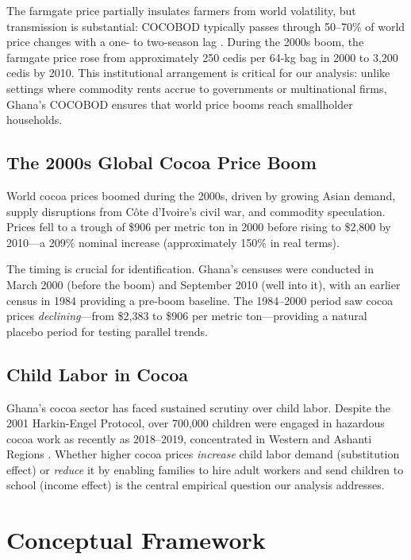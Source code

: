 \documentclass[12pt]{article}
\begin{document}
The farmgate price partially insulates farmers from world volatility, but transmission is substantial: COCOBOD typically passes through 50--70\% of world price changes with a one- to two-season lag \citep{kolavalli2011}. During the 2000s boom, the farmgate price rose from approximately 250 cedis per 64-kg bag in 2000 to 3,200 cedis by 2010. This institutional arrangement is critical for our analysis: unlike settings where commodity rents accrue to governments or multinational firms, Ghana's COCOBOD ensures that world price booms reach smallholder households.

\subsection{The 2000s Global Cocoa Price Boom}

World cocoa prices boomed during the 2000s, driven by growing Asian demand, supply disruptions from C\^{o}te d'Ivoire's civil war, and commodity speculation. Prices fell to a trough of \$906 per metric ton in 2000 before rising to \$2,800 by 2010---a 209\% nominal increase (approximately 150\% in real terms).

The timing is crucial for identification. Ghana's censuses were conducted in March 2000 (before the boom) and September 2010 (well into it), with an earlier census in 1984 providing a pre-boom baseline. The 1984--2000 period saw cocoa prices \textit{declining}---from \$2,383 to \$906 per metric ton---providing a natural placebo period for testing parallel trends.

\subsection{Child Labor in Cocoa}

Ghana's cocoa sector has faced sustained scrutiny over child labor. Despite the 2001 Harkin-Engel Protocol, over 700,000 children were engaged in hazardous cocoa work as recently as 2018--2019, concentrated in Western and Ashanti Regions \citep{ilo2020, norc2020}. Whether higher cocoa prices \textit{increase} child labor demand (substitution effect) or \textit{reduce} it by enabling families to hire adult workers and send children to school (income effect) is the central empirical question our analysis addresses.


\section{Conceptual Framework}
\label{sec:framework}
\end{document}
